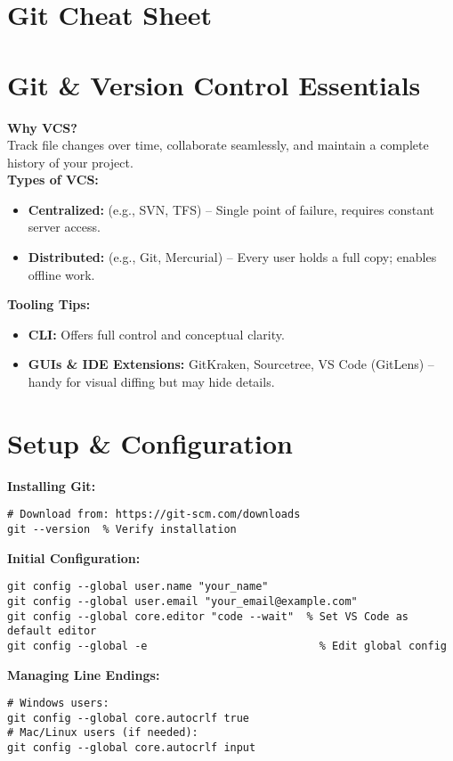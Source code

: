 \documentclass[a4paper,10pt]{article}
\begin{document}
\section*{Git Cheat Sheet}

\section{Git \& Version Control Essentials}
\textbf{Why VCS?} \\
Track file changes over time, collaborate seamlessly, and maintain a complete history of your project.\\[5pt]
\textbf{Types of VCS:}
\begin{itemize}
  \item \textbf{Centralized:} (e.g., SVN, TFS) – Single point of failure, requires constant server access.
  \item \textbf{Distributed:} (e.g., Git, Mercurial) – Every user holds a full copy; enables offline work.
\end{itemize}

\textbf{Tooling Tips:} \\
\begin{itemize}
  \item \textbf{CLI:} Offers full control and conceptual clarity.
  \item \textbf{GUIs \& IDE Extensions:} GitKraken, Sourcetree, VS Code (GitLens) – handy for visual diffing but may hide details.
\end{itemize}

\section{Setup \& Configuration}
\textbf{Installing Git:}
\begin{lstlisting}
# Download from: https://git-scm.com/downloads
git --version  % Verify installation
\end{lstlisting}

\textbf{Initial Configuration:}
\begin{lstlisting}
git config --global user.name "your_name"
git config --global user.email "your_email@example.com"
git config --global core.editor "code --wait"  % Set VS Code as default editor
git config --global -e                           % Edit global config
\end{lstlisting}

\textbf{Managing Line Endings:}
\begin{lstlisting}
# Windows users:
git config --global core.autocrlf true
# Mac/Linux users (if needed):
git config --global core.autocrlf input
\end{lstlisting}
\end{document}
